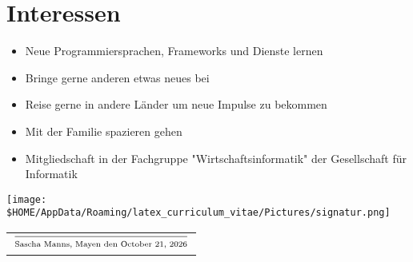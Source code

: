 \documentclass[a4paper]{friggeri-cv} %
\begin{document}

\section{Interessen}
\begin{itemize}
  \item Neue Programmiersprachen, Frameworks und Dienste lernen
  \item Bringe gerne anderen etwas neues bei
  \item Reise gerne in andere Länder um neue Impulse zu bekommen
  \item Mit der Familie spazieren gehen
  \item Mitgliedschaft in der Fachgruppe "Wirtschaftsinformatik" der Gesellschaft für Informatik
\end{itemize}







\begin{center}
\texttt{[image: \$HOME/AppData/Roaming/latex\_curriculum\_vitae/Pictures/signatur.png]} \\
\begin{tabular}{@{}l@{}}
\\ $\frac{}{\strut\textnormal{Sascha Manns, Mayen den \today}}$
\end{tabular}
\end{center}

\end{document}
